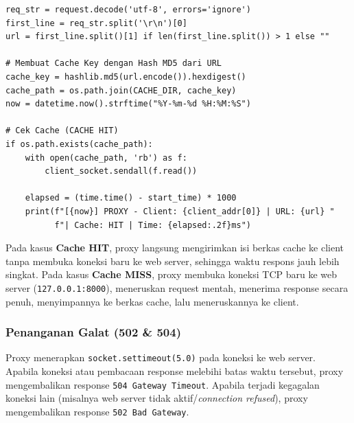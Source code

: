 \documentclass[11pt,a4paper]{article}
\begin{document}
\begin{lstlisting}[caption={Pembentukan cache key dan pengecekan Cache HIT/MISS}, label={lst:cache-key}]
req_str = request.decode('utf-8', errors='ignore')
first_line = req_str.split('\r\n')[0]
url = first_line.split()[1] if len(first_line.split()) > 1 else ""

# Membuat Cache Key dengan Hash MD5 dari URL
cache_key = hashlib.md5(url.encode()).hexdigest()
cache_path = os.path.join(CACHE_DIR, cache_key)
now = datetime.now().strftime("%Y-%m-%d %H:%M:%S")

# Cek Cache (CACHE HIT)
if os.path.exists(cache_path):
    with open(cache_path, 'rb') as f:
        client_socket.sendall(f.read())

    elapsed = (time.time() - start_time) * 1000
    print(f"[{now}] PROXY - Client: {client_addr[0]} | URL: {url} "
          f"| Cache: HIT | Time: {elapsed:.2f}ms")
\end{lstlisting}

\noindent Pada kasus \textbf{Cache HIT}, proxy langsung mengirimkan isi berkas cache ke client tanpa membuka koneksi baru ke web server, sehingga waktu respons jauh lebih singkat. Pada kasus \textbf{Cache MISS}, proxy membuka koneksi TCP baru ke web server (\texttt{127.0.0.1:8000}), meneruskan request mentah, menerima response secara penuh, menyimpannya ke berkas cache, lalu meneruskannya ke client.

\subsubsection{Penanganan Galat (502 \& 504)}

Proxy menerapkan \texttt{socket.settimeout(5.0)} pada koneksi ke web server. Apabila koneksi atau pembacaan response melebihi batas waktu tersebut, proxy mengembalikan response \texttt{504 Gateway Timeout}. Apabila terjadi kegagalan koneksi lain (misalnya web server tidak aktif/\textit{connection refused}), proxy mengembalikan response \texttt{502 Bad Gateway}.
\end{document}
